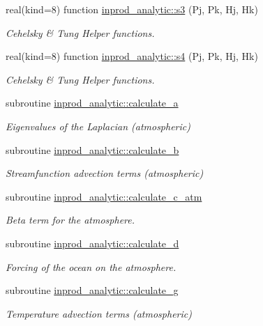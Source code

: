 \begin{DoxyCompactItemize}
real(kind=8) function \hyperlink{namespaceinprod__analytic_a671ca8c3aae1db0a453a13e94462baa0}{inprod\+\_\+analytic\+::s3} (Pj, Pk, Hj, Hk)
\begin{DoxyCompactList}\small\item\em Cehelsky \& Tung Helper functions. \end{DoxyCompactList}\item 
real(kind=8) function \hyperlink{namespaceinprod__analytic_a8dacf930ffdf8fd09da0a77bfd4d3a4b}{inprod\+\_\+analytic\+::s4} (Pj, Pk, Hj, Hk)
\begin{DoxyCompactList}\small\item\em Cehelsky \& Tung Helper functions. \end{DoxyCompactList}\item 
subroutine \hyperlink{namespaceinprod__analytic_a9a003ced8e18bf5299c05dc76a8b1e47}{inprod\+\_\+analytic\+::calculate\+\_\+a}
\begin{DoxyCompactList}\small\item\em Eigenvalues of the Laplacian (atmospheric) \end{DoxyCompactList}\item 
subroutine \hyperlink{namespaceinprod__analytic_ab2db39e602d165af9d709d712ebf1b1d}{inprod\+\_\+analytic\+::calculate\+\_\+b}
\begin{DoxyCompactList}\small\item\em Streamfunction advection terms (atmospheric) \end{DoxyCompactList}\item 
subroutine \hyperlink{namespaceinprod__analytic_afa4abc3665e4628bda2deb421c123e05}{inprod\+\_\+analytic\+::calculate\+\_\+c\+\_\+atm}
\begin{DoxyCompactList}\small\item\em Beta term for the atmosphere. \end{DoxyCompactList}\item 
subroutine \hyperlink{namespaceinprod__analytic_a1b0c41711a02f385766aeef2faf22830}{inprod\+\_\+analytic\+::calculate\+\_\+d}
\begin{DoxyCompactList}\small\item\em Forcing of the ocean on the atmosphere. \end{DoxyCompactList}\item 
subroutine \hyperlink{namespaceinprod__analytic_a60bd361584d695120fff51940e523f0e}{inprod\+\_\+analytic\+::calculate\+\_\+g}
\begin{DoxyCompactList}\small\item\em Temperature advection terms (atmospheric) \end{DoxyCompactList}\item 

\end{DoxyCompactItemize}
